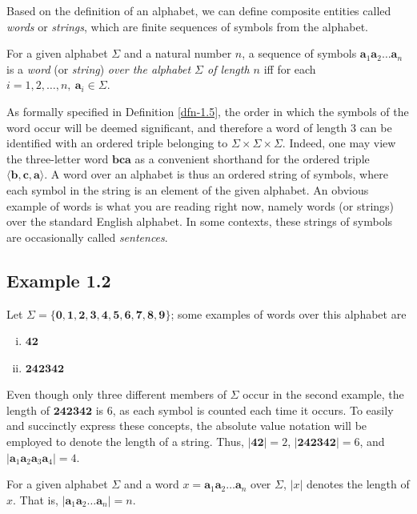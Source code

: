 Based on the definition of an alphabet, we can define composite entities called
\emph{words} or \emph{strings}, which are finite sequences of symbols from the
alphabet.

\begin{dfn}\label{dfn-1.2}
For a given alphabet $\Sigma$ and a natural number $n$, a sequence of symbols
$\pmb{a}_1\pmb{a}_2\ldots\pmb{a}_n$ is a \emph{word} (or \emph{string}) \emph{over
the alphabet $\Sigma$ of length $n$} iff for each $i=1,2,\ldots,n,\ \pmb{a}_i\in
\Sigma$.
\end{dfn}

As formally specified in Definition \ref{dfn-1.5}, the order in which the
symbols of the word occur will be deemed significant, and therefore a word of
length 3 can be identified with an ordered triple belonging to
$\Sigma \times \Sigma \times \Sigma$. Indeed, one may view the three-letter word
$\pmb{bca}$ as a convenient shorthand for the ordered triple $\langle \pmb{b, c, a}\rangle$.
A word over an alphabet is thus an ordered string of symbols, where each symbol
in the string is an element of the given alphabet. An obvious example of words
is what you are reading right now, namely words (or strings) over the
standard English alphabet. In some contexts, these strings of symbols are
occasionally called \emph{sentences}.

\subsection*{Example 1.2}

Let $\Sigma = \{\pmb{0},\pmb{1},\pmb{2},\pmb{3},\pmb{4},\pmb{5},\pmb{6},\pmb{7},
\pmb{8},\pmb{9}\}$; some examples of words over this alphabet are
\begin{enumerate}[i.]
\item $\pmb{42}$
\item $\pmb{242342}$
\end{enumerate}

Even though only three different members of $\Sigma$ occur in the second
example, the length of $\pmb{242342}$ is 6, as each symbol is counted each time
it occurs. To easily and succinctly express these concepts, the absolute value
notation will be employed to denote the length of a string. Thus, $|\pmb{42}|=2$,
$|\pmb{242342}|=6$, and $|\pmb{a}_1\pmb{a}_2\pmb{a}_3\pmb{a}_4|=4$.

\begin{dfn}\label{dfn-1.3}
For a given alphabet $\Sigma$ and a word $x=\pmb{a}_1\pmb{a}_2\ldots\pmb{a}_n$
over $\Sigma$, $|x|$ denotes the length of $x$. That is, $|\pmb{a}_1\pmb{a}_2
\ldots\pmb{a}_n|=n$.
\end{dfn}

